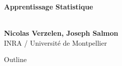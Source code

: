 \documentclass[unknownkeysallowed]{beamer}
\begin{document}



\begin{frame}
\bigskip
\bigskip
\begin{center}{
\LARGE\color{marron}
\textbf{Apprentissage Statistique}\\
\textbf{}\\
\vspace{0.5cm}
}
\end{center}

\begin{center}
\textbf{Nicolas Verzelen, Joseph Salmon} \\
\vspace{0.5cm}
INRA / Université de Montpellier \\
\end{center}
\end{frame}






\begin{frame}{Outline}
\tableofcontents[hideallsubsections]
\end{frame}







\end{document}
